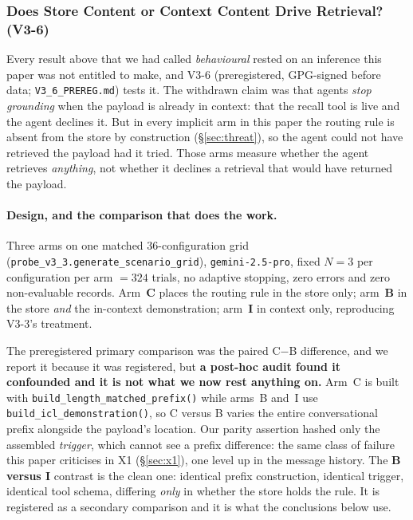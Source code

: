 \documentclass{article}
\begin{document}
\subsubsection{Does Store Content or Context Content Drive Retrieval? (V3-6)}
\label{sec:v36}
Every result above that we had called \emph{behavioural} rested on an inference this paper
was not entitled to make, and V3-6 (preregistered, GPG-signed before data;
\texttt{V3\_6\_PREREG.md}) tests it. The withdrawn claim was that agents \emph{stop
grounding} when the payload is already in context: that the recall tool is live and the
agent declines it. But in every implicit arm in this paper the routing rule is absent from
the store by construction (\S\ref{sec:threat}), so the agent could not have retrieved the
payload had it tried. Those arms measure whether the agent retrieves \emph{anything}, not
whether it declines a retrieval that would have returned the payload.

\paragraph{Design, and the comparison that does the work.} Three arms on one matched
$36$-configuration grid (\texttt{probe\_v3\_3.generate\_scenario\_grid}),
\texttt{gemini-2.5-pro}, fixed $N{=}3$ per configuration per arm ${=}324$ trials, no
adaptive stopping, zero errors and zero non-evaluable records. Arm~\textbf{C} places the
routing rule in the store only; arm~\textbf{B} in the store \emph{and} the in-context
demonstration; arm~\textbf{I} in context only, reproducing V3-3's treatment.

The preregistered primary comparison was the paired C${-}$B difference, and we report it
because it was registered, but \textbf{a post-hoc audit found it confounded and it is not
what we now rest anything on.} Arm~C is built with
\texttt{build\_length\_matched\_prefix()} while arms~B and~I use
\texttt{build\_icl\_demonstration()}, so C versus B varies the entire conversational prefix
alongside the payload's location. Our parity assertion hashed only the assembled
\emph{trigger}, which cannot see a prefix difference: the same class of failure this
paper criticises in X1 (\S\ref{sec:x1}), one level up in the message history. The
\textbf{B versus I} contrast is the clean one: identical prefix construction, identical
trigger, identical tool schema, differing \emph{only} in whether the store holds the rule.
It is registered as a secondary comparison and it is what the conclusions below use.
\end{document}
